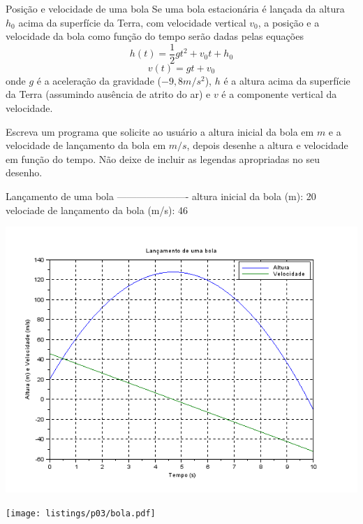 \documentclass[11pt]{practice}
\begin{document}
\begin{task}[breakable]{Posição e velocidade de uma bola }{}
  Se uma bola estacionária é lançada da altura $h_0$ acima da superfície
  da Terra, com velocidade vertical $v_0$, a posição e a velocidade da
  bola como função do tempo serão dadas pelas equações
  \[ h(t) = \frac{1}{2}gt^2 + v_0t + h_0 \]
  \[ v(t) = gt + v_0 \] onde $g$ é a aceleração da gravidade
  ($-9,8m/s^2$), $h$ é a altura acima da superfície da Terra (assumindo
  ausência de atrito do ar) e $v$ é a componente vertical da velocidade.

  Escreva um programa que solicite ao usuário a altura inicial da bola
  em $m$ e a velocidade de lançamento da bola em $m/s$, depois desenhe a
  altura e velocidade em função do tempo. Não deixe de incluir as
  legendas apropriadas no seu desenho.

  \begin{runexample}
Lançamento de uma bola
----------------------
altura inicial da bola (m): 20
velociade de lançamento da bola (m/s): 46
  \end{runexample}
  \begin{center}
    \includegraphics[width=\linewidth]{images/bola}
  \end{center}

  \tcblower
  \solution
  \texttt{[image: listings/p03/bola.pdf]}
\end{task}
\end{document}
